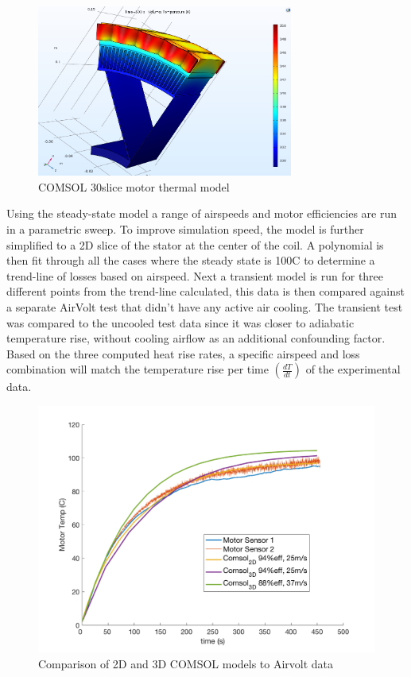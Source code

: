 \documentclass[]{aiaa-tc}%
\begin{document}
\begin{figure}[!htb]%
	\centering
	\includegraphics[width=0.75\textwidth]{figures/jmx57_motor_comsol.png}
	\caption{COMSOL 30\degree slice motor thermal model}
	\label{fig:comsol}
\end{figure}

Using the steady-state model a range of airspeeds and motor efficiencies are run in a parametric sweep. To improve simulation speed, the model is further simplified to a 2D slice of the stator at the center of the coil. A polynomial is then fit through all the cases where the steady state is 100\degree C to determine a trend-line of losses based on airspeed.
Next a transient model is run for three different points from the trend-line calculated, this data is then compared against a separate AirVolt test that didn't have any active air cooling. The transient test was compared to the uncooled test data since it was closer to adiabatic temperature rise, without cooling airflow as an additional confounding factor. Based on the three computed heat rise rates, a specific airspeed and loss combination will match the temperature rise per time $(\frac{dT}{dt})$ of the experimental data.

\begin{figure}[!h]%
	\centering
	\includegraphics[width=1.0\textwidth]{figures/COMSOLvsTest.png}
	\caption{Comparison of 2D and 3D COMSOL models to Airvolt data}
	\label{fig:COMSOLresults}
\end{figure}
\end{document}
